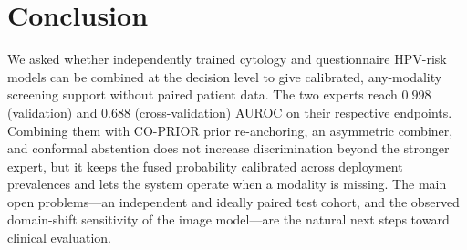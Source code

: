 \documentclass[sigplan,nonacm,screen]{acmart}
\begin{document}
\section{Conclusion}
We asked whether independently trained cytology and questionnaire HPV-risk models can be combined at the
decision level to give calibrated, any-modality screening support without paired patient data. The two experts
reach $0.998$ (validation) and $0.688$ (cross-validation) AUROC on their respective endpoints. Combining them
with CO-PRIOR prior re-anchoring, an asymmetric combiner, and conformal abstention does not increase
discrimination beyond the stronger expert, but it keeps the fused probability calibrated across deployment
prevalences and lets the system operate when a modality is missing. The main open problems---an independent
and ideally paired test cohort, and the observed domain-shift sensitivity of the image model---are the natural
next steps toward clinical evaluation.



\end{document}
